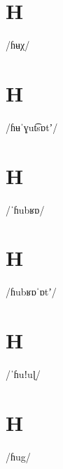 \documentclass[10pt,a4paper,twoside]{book}
\begin{document}
\section*{H}

\begin{multicols}{3}
 {/ɦʉχ/} {}
\end{multicols}

\section*{H}

\begin{multicols}{3}
 {/ɦʉˈɣut͡sɒtʼ/} {}
\end{multicols}

\section*{H}

\begin{multicols}{3}
 {/ˈɦubʁɒ/} {}
\end{multicols}

\section*{H}

\begin{multicols}{3}
 {/ɦubʁɒˈɒtʼ/} {}
\end{multicols}

\section*{H}

\begin{multicols}{3}
 {/ˈɦuǃuɭ/} {}
\end{multicols}

\section*{H}

\begin{multicols}{3}
 {/ɦug/} {}
\end{multicols}
\end{document}
